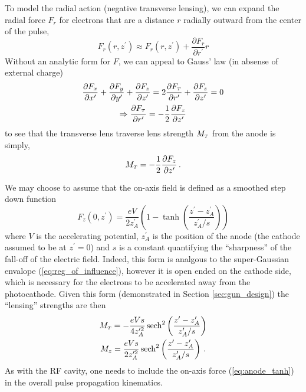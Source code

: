 To model the radial action (negative transverse lensing), we can expand the radial force $F_r$ for electrons that are a distance $r$ radially outward from the center of the pulse,
\begin{equation}
  F_r(r,z^{\prime}) \approx F_r(r,z^{\prime}) + \frac{\partial F_r}{\partial r^{\prime}} r
\end{equation}
Without an analytic form for $F$, we can appeal to Gauss' law (in absense of external charge)
\begin{gather}
  \frac{\partial F_x}{\partial x^{\prime}} + \frac{\partial F_y}{\partial y^{\prime}} + \frac{\partial F_z}{\partial z^{\prime}} = 2 \frac{\partial F_{{\scriptscriptstyle T}}}{\partial r^{\prime}} + \frac{\partial F_z}{\partial z^{\prime}} = 0 \\
  \Rightarrow \frac{\partial F_{{\scriptscriptstyle T}}}{\partial r^{\prime}} = - \frac{1}{2} \frac{\partial F_z}{\partial z^{\prime}}
\end{gather} 
to see that the transverse lens traverse lens strength $M_{{\scriptscriptstyle T}}$ from the anode is simply,
\begin{equation}
  M_{{\scriptscriptstyle T}} = -\frac{1}{2}\frac{\partial F_z}{\partial z^{\prime}} \, \text{.}
\end{equation}

We may choose to assume that the on-axis field is defined as a smoothed step down function
\begin{equation} \label{eq:anode_tanh}
  F_z(0,z^{\prime}) = \frac{eV}{2z^{\prime}_A} \left( 1 - \tanh \left( \frac{ z^{\prime} - z^{\prime}_A }{ z^{\prime}_A / s } \right) \right)
\end{equation}
where $V$ is the accelerating potential, $z^{\prime}_A$ is the position of the anode (the cathode assumed to be at $z^{\prime} = 0$) and $s$ is a constant quantifying the ``sharpness'' of the fall-off of the electric field.
Indeed, this form is analgous to the super-Gaussian envalope (\ref{eq:reg_of_influence}), however it is open ended on the cathode side, which is necessary for the electrons to be accelerated away from the photocathode.
Given this form (demonstrated in Section \ref{sec:gun_design}) the ``lensing'' strengths are then
\begin{gather}
  M_{{\scriptscriptstyle T}} = -\frac{eVs}{4z^{\prime 2}_A} \operatorname{sech}^2 \left( \frac{z^{\prime} - z^{\prime}_A }{ z^{\prime}_A / s } \right) \\
  M_z = \frac{eVs}{2z^{\prime 2}_A} \operatorname{sech}^2 \left( \frac{z^{\prime} - z^{\prime}_A }{ z^{\prime}_A / s } \right) \, \text{.}
\end{gather}
As with the RF cavity, one needs to include the on-axis force (\ref{eq:anode_tanh}) in the overall pulse propagation kinematics.

